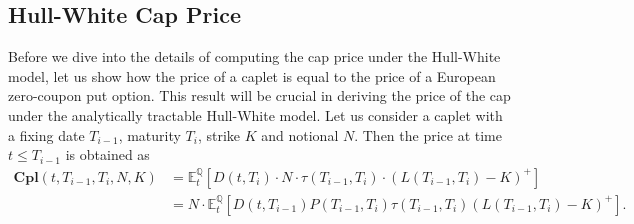 \documentclass[titlepage, 12pt]{article}
\newcommand{\condexpect}[3]{\mathbb{E}^\mathbb{#1}_{#2}\left[#3\right]}
\begin{document}
	\subsection{Hull-White Cap Price}
	
	Before we dive into the details of computing the cap price under the Hull-White model, let us show how the price of a caplet is equal to the price of a European zero-coupon put option. This result will be crucial in deriving the price of the cap under the analytically tractable Hull-White model. Let us consider a caplet with a fixing date $T_{i-1}$, maturity $T_i$, strike $K$ and notional $N$. Then the price at time $t\leq T_{i-1}$ is obtained as
	\begin{equation}
		\begin{split}
			\mathbf{Cpl}(t,T_{i-1},T_i,N,K) &= \condexpect{Q}{t}{D(t,T_i)\cdot N\cdot\tau(T_{i-1},T_{i})\cdot(L(T_{i-1},T_{i})-K)^+} \\
			&= N\cdot\condexpect{Q}{t}{D(t,T_{i-1})P(T_{i-1},T_i) \tau(T_{i-1},T_{i})(L(T_{i-1},T_{i})-K)^+}. \\
		\end{split}
	\end{equation}
	
\end{document}
